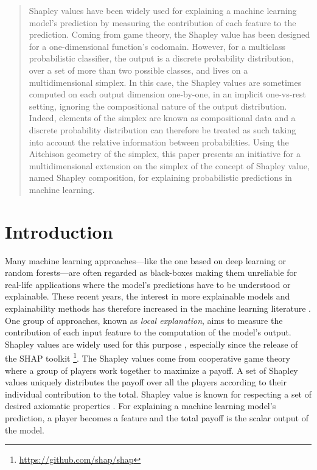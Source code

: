 \documentclass{article}
\theoremstyle{plain}
\theoremstyle{definition}
\theoremstyle{remark}
\begin{document}
\printAffiliationsAndNotice{\icmlEqualContribution} %

\begin{abstract}
  Shapley values have been widely used for explaining a machine learning model's prediction by measuring the contribution of each feature to the prediction. Coming from game theory, the Shapley value has been designed for a one-dimensional function's codomain. However, for a multiclass probabilistic classifier, the output is a discrete probability distribution, over a set of more than two possible classes, and lives on a multidimensional simplex. In this case, the Shapley values are sometimes computed on each output dimension one-by-one, in an implicit one-vs-rest setting, ignoring the compositional nature of the output distribution. Indeed, elements of the simplex are known as compositional data and a discrete probability distribution can therefore be treated as such taking into account the relative information between probabilities. Using the Aitchison geometry of the simplex, this paper presents an initiative for a multidimensional extension on the simplex of the concept of Shapley value, named Shapley composition, for explaining probabilistic predictions in machine learning.
\end{abstract}

\section{Introduction}

Many machine learning approaches---like the one based on deep learning or random forests---are often regarded as black-boxes making them unreliable for real-life applications where the model's predictions have to be understood or explainable. These recent years, the interest in more explainable models and explainability methods has therefore increased in the machine learning literature \cite{angelov2021explainable}. One group of approaches, known as \emph{local explanation}, aims to measure the contribution of each input feature to the computation of the model's output. Shapley values are widely used for this purpose \cite{vstrumbelj2014explaining,datta2016}, especially since the release of the SHAP toolkit \cite{NIPS2017_7062}\footnote{\url{https://github.com/shap/shap}}. The Shapley values come from cooperative game theory where a group of players work together to maximize a payoff. A set of Shapley values uniquely distributes the payoff over all the players according to their individual contribution to the total. Shapley value is known for respecting a set of desired axiomatic properties \cite{shapley1953value}. For explaining a machine learning model's prediction, a player becomes a feature and the total payoff is the scalar output of the model.
\end{document}
